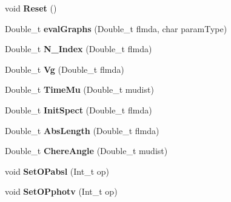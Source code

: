\begin{DoxyCompactItemize}
\item 
\hypertarget{classWaterModel_ac8a4cfb002c6b3be2ffd7152ca5b3957}{void {\bfseries Reset} ()}\label{classWaterModel_ac8a4cfb002c6b3be2ffd7152ca5b3957}

\item 
\hypertarget{classWaterModel_a8a46f941b46a18a2c92b2bd51aa13cc6}{Double\-\_\-t {\bfseries eval\-Graphs} (Double\-\_\-t flmda, char param\-Type)}\label{classWaterModel_a8a46f941b46a18a2c92b2bd51aa13cc6}

\item 
\hypertarget{classWaterModel_a0f254d7e4ab49257491faea7762aa1fd}{Double\-\_\-t {\bfseries N\-\_\-\-Index} (Double\-\_\-t flmda)}\label{classWaterModel_a0f254d7e4ab49257491faea7762aa1fd}

\item 
\hypertarget{classWaterModel_aadea18f1b34dc39e49516adbdb16a8eb}{Double\-\_\-t {\bfseries Vg} (Double\-\_\-t flmda)}\label{classWaterModel_aadea18f1b34dc39e49516adbdb16a8eb}

\item 
\hypertarget{classWaterModel_af8281088a7db1797dcd88ef277824763}{Double\-\_\-t {\bfseries Time\-Mu} (Double\-\_\-t mudist)}\label{classWaterModel_af8281088a7db1797dcd88ef277824763}

\item 
\hypertarget{classWaterModel_a046ec6f98a503f2aea0ca4b6ee4bdd0d}{Double\-\_\-t {\bfseries Init\-Spect} (Double\-\_\-t flmda)}\label{classWaterModel_a046ec6f98a503f2aea0ca4b6ee4bdd0d}

\item 
\hypertarget{classWaterModel_a46943a79b03f5840475ab122d40da342}{Double\-\_\-t {\bfseries Abs\-Length} (Double\-\_\-t flmda)}\label{classWaterModel_a46943a79b03f5840475ab122d40da342}

\item 
\hypertarget{classWaterModel_a892483911e55b10dddabc9a13c441ed2}{Double\-\_\-t {\bfseries Chere\-Angle} (Double\-\_\-t mudist)}\label{classWaterModel_a892483911e55b10dddabc9a13c441ed2}

\item 
\hypertarget{classWaterModel_a03aba5ce7f51604d9b2971d482f7a5b3}{void {\bfseries Set\-O\-Pabsl} (Int\-\_\-t op)}\label{classWaterModel_a03aba5ce7f51604d9b2971d482f7a5b3}

\item 
\hypertarget{classWaterModel_a426801e8922a7490795f15107a8eecb8}{void {\bfseries Set\-O\-Pphotv} (Int\-\_\-t op)}\label{classWaterModel_a426801e8922a7490795f15107a8eecb8}


\end{DoxyCompactItemize}

